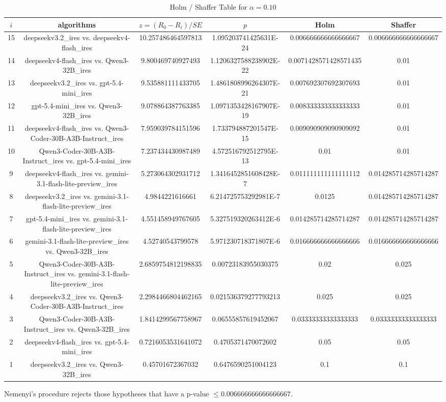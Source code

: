 \documentclass[a4paper,10pt]{article}
\begin{document}
\begin{landscape}
\begin{table}[!htp]
\centering\tiny
\caption{Holm / Shaffer Table for $\alpha=0.10$}
\begin{tabular}{cccccc}
$i$&algorithms&$z=(R_0 - R_i)/SE$&$p$&Holm&Shaffer\\
\hline
15&deepseekv3.2_ires vs. deepseekv4-flash_ires&10.257486464597813&1.095203741425631E-24&0.006666666666666667&0.006666666666666667\\14&deepseekv4-flash_ires vs. Qwen3-32B_ires&9.800469740927493&1.1206327588238902E-22&0.0071428571428571435&0.01\\13&deepseekv3.2_ires vs. gpt-5.4-mini_ires&9.535881111433705&1.4861808996264307E-21&0.007692307692307693&0.01\\12&gpt-5.4-mini_ires vs. Qwen3-32B_ires&9.078864387763385&1.0971353428167907E-19&0.008333333333333333&0.01\\11&deepseekv4-flash_ires vs. Qwen3-Coder-30B-A3B-Instruct_ires&7.959039784151596&1.733794887201547E-15&0.009090909090909092&0.01\\10&Qwen3-Coder-30B-A3B-Instruct_ires vs. gpt-5.4-mini_ires&7.237434430987489&4.572516792512795E-13&0.01&0.01\\9&deepseekv4-flash_ires vs. gemini-3.1-flash-lite-preview_ires&5.273064302931712&1.3416452851608428E-7&0.011111111111111112&0.014285714285714287\\8&deepseekv3.2_ires vs. gemini-3.1-flash-lite-preview_ires&4.9844221616661&6.214725753292981E-7&0.0125&0.014285714285714287\\7&gpt-5.4-mini_ires vs. gemini-3.1-flash-lite-preview_ires&4.551458949767605&5.327519320263412E-6&0.014285714285714287&0.014285714285714287\\6&gemini-3.1-flash-lite-preview_ires vs. Qwen3-32B_ires&4.52740543799578&5.971230718371807E-6&0.016666666666666666&0.016666666666666666\\5&Qwen3-Coder-30B-A3B-Instruct_ires vs. gemini-3.1-flash-lite-preview_ires&2.6859754812198835&0.00723183955030375&0.02&0.025\\4&deepseekv3.2_ires vs. Qwen3-Coder-30B-A3B-Instruct_ires&2.2984466804462165&0.021536379277793213&0.025&0.025\\3&Qwen3-Coder-30B-A3B-Instruct_ires vs. Qwen3-32B_ires&1.8414299567758967&0.06555857619452067&0.03333333333333333&0.03333333333333333\\2&deepseekv4-flash_ires vs. gpt-5.4-mini_ires&0.7216053531641072&0.4705371470072602&0.05&0.05\\1&deepseekv3.2_ires vs. Qwen3-32B_ires&0.45701672367032&0.6476590251004123&0.1&0.1\\\hline
\end{tabular}
\end{table}
Nemenyi's procedure rejects those hypotheses that have a p-value $\le0.006666666666666667$.



\end{landscape}
\end{document}
